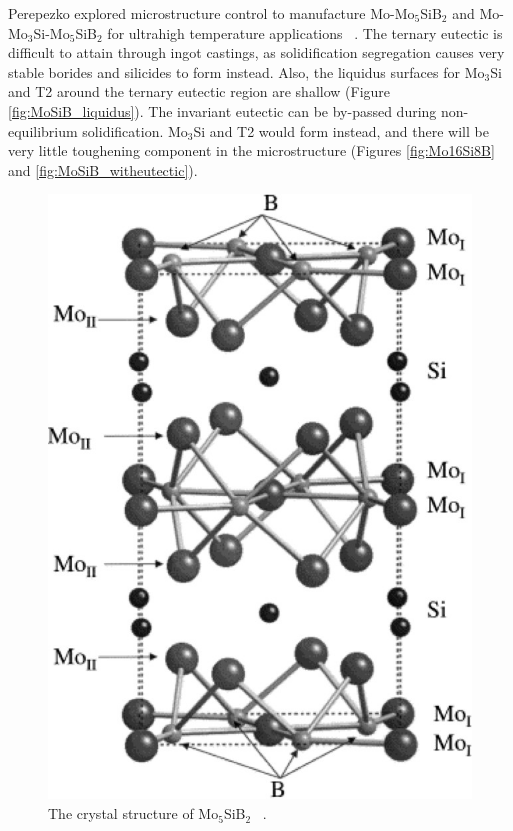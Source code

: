 Perepezko explored microstructure control to manufacture Mo-Mo$_5$SiB$_2$ and Mo-Mo$_3$Si-Mo$_5$SiB$_2$ for ultrahigh temperature applications ~\cite{perepezko01}. The ternary eutectic is difficult to attain through ingot castings, as solidification segregation causes very stable borides and silicides to form instead.  Also, the liquidus surfaces for Mo$_3$Si and T2 around the ternary eutectic region are shallow (Figure \ref{fig:MoSiB_liquidus}). The invariant eutectic can be by-passed during non-equilibrium solidification. Mo$_3$Si and T2 would form instead, and there will be very little toughening component in the microstructure (Figures \ref{fig:Mo16Si8B} and \ref{fig:MoSiB_witheutectic}).%
%
\vspace{8mm}
\begin{figure}[H]
\begin{center}
\includegraphics{T2structure}
\caption{The crystal structure of Mo$_5$SiB$_2$ ~\cite{rawn01}. }
\label{fig:T2structure}
\end{center}
\end{figure}
